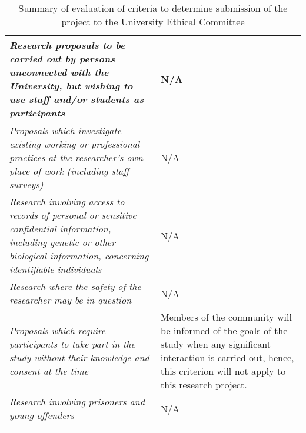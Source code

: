 \begin{longtable}{|p{10cm}|p{4cm}|}
\textsl{Research proposals to be carried out by persons unconnected with the University, but wishing to use staff and\slash or students as participants}                                                                    & N/A        \\ \hline
\textsl{Proposals which investigate existing working or professional practices at the researcher’s own place of work (including staff surveys)}                                                                            & N/A        \\ \hline
\textsl{Research involving access to records of personal or sensitive confidential information, including genetic or other biological information, concerning identifiable individuals}& N/A        \\ \hline
\textsl{Research where the safety of the researcher may be in question}                                                                                                                                                     & N/A        \\ \hline
\textsl{Proposals which require participants to take part in the study without their knowledge and consent at the time}                                                                                                     & Members of the community will be informed of the goals of the study when any significant interaction is carried out, hence, this criterion will not apply to this research project.        \\ \hline
\textsl{Research involving prisoners and young offenders}                                                                                                                                                                   & N/A        \\ \hline
\caption[Evaluation to determine submission to the University Ethical Committee]{Summary of evaluation of criteria to determine submission of the project to the University Ethical Committee \parencite[4-5]{UEC2013}}
\label{tab:ethical}
\end{longtable}